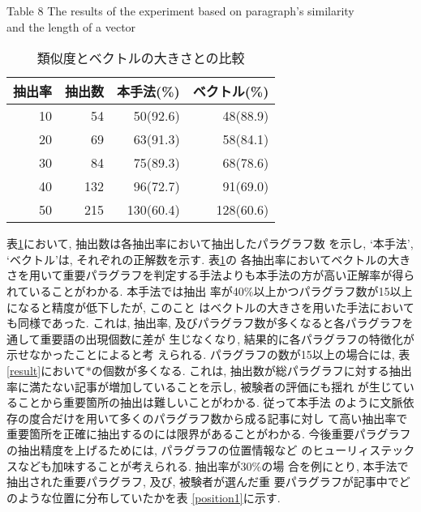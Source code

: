 {\footnotesize
\begin{table}[htbp]
\begin{center}
\caption{類似度とベクトルの大きさとの比較} \label{cluster}
Table 8 The results of the experiment based on paragraph's similarity \\
and the length of a vector \\
\begin{tabular}{r|r|r|r} \hline \hline
抽出率 &抽出数 &本手法(\%) &ベクトル(\%) \\ \hline
10 &54 &50(92.6) &48(88.9) \\ \hline
20 &69 &63(91.3) &58(84.1) \\ \hline
30 &84 &75(89.3) &68(78.6) \\ \hline
40 &132 &96(72.7) &91(69.0) \\ \hline
50 &215 &130(60.4) &128(60.6) \\ \hline
\end{tabular}
\end{center}
\end{table}
}

\noindent
表\ref{cluster}において, 抽出数は各抽出率において抽出したパラグラフ数
を示し, `本手法', `ベクトル'は, それぞれの正解数を示す.  表\ref{cluster}の
各抽出率においてベクトルの大きさを用いて重要パラグラフを判定する手法\hspace{0.1mm}よりも本手法\hspace{0.1mm}の\hspace{0.1mm}方が高い正解率\hspace{0.1mm}が\hspace{0.1mm}得られていることがわかる. \hspace{0.1mm}本手法では抽出
率が40\%以上かつパラグラフ数が15以上になると精度が低下したが, このこと
はベクトルの大きさを用いた手法においても同様であった.  これは, 抽出率, 
及びパラグラフ数が多くなると各パラグラフを通して重要語の出現個数に差が
生じなくなり, \hspace{0.1mm}結\hspace{0.1mm}果\hspace{0.1mm}的に各パラグラフの特\hspace{0.1mm}徴\hspace{0.1mm}化が示せなかったことによると考
えられる.  パラグラフの数が15以上の場合には, 表
\ref{result}において$\ast$の個数が多くなる.  これは, 抽出数が総パラグラフに対する抽出率に満たない記事が増加していることを示し, 被験者の評価にも揺れ
が生じていることから重要箇所の抽出は難しいことがわかる.  従って本手法
のように文脈依存の度合だけを用いて多くのパラグラフ数から成る記事に対し
て高い抽出率で重要箇所を正確に抽出するのには限界があることがわかる.
今後重要パラグラフの抽出精度を上げるためには, パラグラフの位置情報など
のヒューリィステックスなども加味することが考えられる.  抽出率が30\%の場
合を例にとり, 本手法で抽出された重要パラグラフ, 及び, 被験者が選んだ重
要パラグラフが記事中でどのような位置に分布していたかを表
\ref{position1}に示す.

